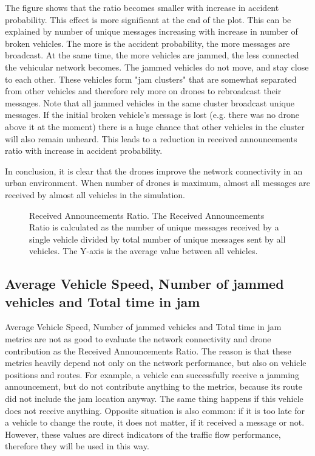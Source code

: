 \documentclass[]{nsm-thesis}
\begin{document}
The figure shows that the ratio becomes smaller with increase in accident probability. This effect is more significant at the end of the plot. This can be explained by number of unique messages increasing with increase in number of broken vehicles. The more is the accident probability, the more messages are broadcast. At the same time, the more vehicles are jammed, the less connected the vehicular network becomes. The jammed vehicles do not move, and stay close to each other. These vehicles form "jam clusters" that are somewhat separated from other vehicles and therefore rely more on drones to rebroadcast their messages. Note that all jammed vehicles in the same cluster broadcast unique messages. If the initial broken vehicle's message is lost (e.g. there was no drone above it at the moment) there is a huge chance that other vehicles in the cluster will also remain unheard. This leads to a reduction in received announcements ratio with increase in accident probability.

In conclusion, it is clear that the drones improve the network connectivity in an urban environment. When number of drones is maximum, almost all messages are received by almost all vehicles in the simulation.

\begin{figure}%
	\centering
	\hfill
	\hfill
	\caption{Received Announcements Ratio. The Received Announcements Ratio is calculated as the number of unique messages received by a single vehicle divided by total number of unique messages sent by all vehicles. The Y-axis is the average value between all vehicles.}%
	\label{fig:Evaluation-ReceivedAnnouncements}%
\end{figure}



\subsection{Average Vehicle Speed, Number of jammed vehicles and Total time in jam}

Average Vehicle Speed, Number of jammed vehicles and Total time in jam metrics are not as good to evaluate the network connectivity and drone contribution as the Received Announcements Ratio. The reason is that these metrics heavily depend not only on the network performance, but also on vehicle positions and routes. For example, a vehicle can successfully receive a jamming announcement, but do not contribute anything to the metrics, because its route did not include the jam location anyway. The same thing happens if this vehicle does not receive anything. Opposite situation is also common: if it is too late for a vehicle to change the route, it does not matter, if it received a message or not. However, these values are direct indicators of the traffic flow performance, therefore they will be used in this way.
\end{document}
